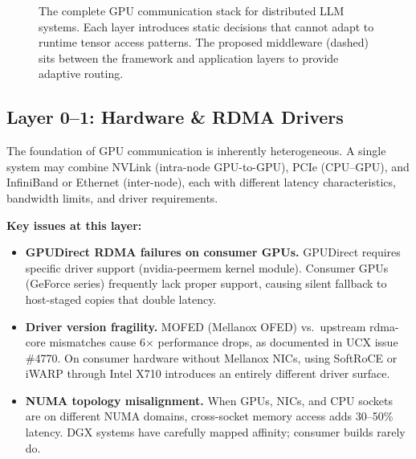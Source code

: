 \documentclass[11pt,letterpaper]{article}
\theoremstyle{definition}
\begin{document}
\begin{figure}[htbp]
{%
}
\caption{The complete GPU communication stack for distributed LLM systems. Each layer introduces static decisions that cannot adapt to runtime tensor access patterns. The proposed middleware (dashed) sits between the framework and application layers to provide adaptive routing.}
\label{fig:gpu-stack}
\end{figure}

\subsection{Layer 0--1: Hardware \& RDMA Drivers}

The foundation of GPU communication is inherently heterogeneous. A single system may combine NVLink (intra-node GPU-to-GPU), PCIe (CPU--GPU), and InfiniBand or Ethernet (inter-node), each with different latency characteristics, bandwidth limits, and driver requirements.

\textbf{Key issues at this layer:}

\begin{itemize}[leftmargin=1.5em, itemsep=3pt]
\item \textbf{GPUDirect RDMA failures on consumer GPUs.} GPUDirect requires specific driver support (nvidia-peermem kernel module). Consumer GPUs (GeForce series) frequently lack proper support, causing silent fallback to host-staged copies that double latency.

\item \textbf{Driver version fragility.} MOFED (Mellanox OFED) vs.\ upstream rdma-core mismatches cause 6$\times$ performance drops, as documented in UCX issue \#4770. On consumer hardware without Mellanox NICs, using SoftRoCE or iWARP through Intel X710 introduces an entirely different driver surface.

\item \textbf{NUMA topology misalignment.} When GPUs, NICs, and CPU sockets are on different NUMA domains, cross-socket memory access adds 30--50\% latency. DGX systems have carefully mapped affinity; consumer builds rarely do.
\end{itemize}
\end{document}
